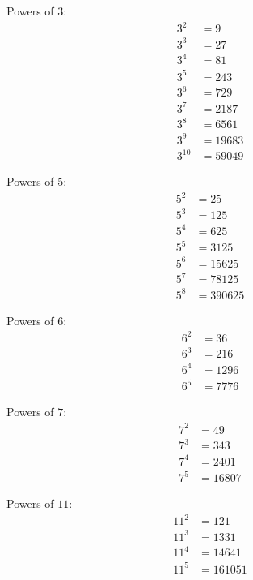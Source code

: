 \documentclass[12pt]{article}
\begin{document}
Powers of $3$:
\begin{align*}
3^2    & = 9\\
3^3    & = 27\\
3^4    & = 81\\
3^5    & = 243\\
3^6    & = 729\\
3^7    & = 2187\\
3^8    & = 6561\\
3^9    & = 19683\\
3^{10} & = 59049
\end{align*}

Powers of $5$:
\begin{align*}
5^2    & = 25\\
5^3    & = 125\\
5^4    & = 625\\
5^5    & = 3125\\
5^6    & = 15625\\
5^7    & = 78125\\
5^8    & = 390625
\end{align*}

Powers of $6$:
\begin{align*}
6^2    & = 36\\
6^3    & = 216\\
6^4    & = 1296\\
6^5    & = 7776
\end{align*}

Powers of $7$:
\begin{align*}
7^2    & = 49\\
7^3    & = 343\\
7^4    & = 2401\\
7^5    & = 16807
\end{align*}

Powers of $11$:
\begin{align*}
11^2    & = 121\\
11^3    & = 1331\\
11^4    & = 14641\\
11^5    & = 161051
\end{align*}

\newpage
\end{document}
